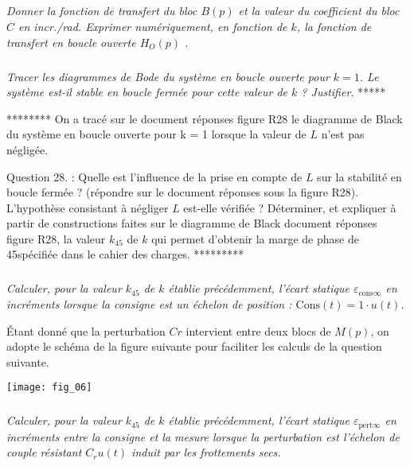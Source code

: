 \begin{multicols}{2}
\subparagraph{}\textit{Donner la fonction de transfert du bloc $B(p)$ et la valeur du coefficient du bloc $C$ en incr./rad.  
Exprimer numériquement, en fonction de $k$, la fonction de transfert en boucle ouverte $H_O(p)$ .}
\ifprof
\begin{corrige}
\end{corrige}
\else
\fi


\subparagraph{}\textit{Tracer les diagrammes de Bode du système en boucle ouverte pour $k = 1$.
Le système est-il stable en boucle fermée pour cette valeur de $k$ ? Justifier.
} *****
\ifprof
\begin{corrige}
\end{corrige}
\else
\fi

********
On a tracé sur le document réponses figure R28 le diagramme de Black du système en boucle ouverte pour k = 1 lorsque la valeur de $L$ n’est pas négligée.
 
Question 28. : 
Quelle est l’influence de la prise en compte de $L$ sur la stabilité en boucle fermée ? (répondre sur le document réponses sous la figure R28). L’hypothèse consistant à négliger $L$ est-elle vérifiée ?
Déterminer, et expliquer à partir de constructions faites sur le diagramme de Black document réponses figure R28, la valeur $k_{45}$ de $k$ qui permet d’obtenir la marge de phase de 45\degres  spécifiée dans le cahier des charges.
*********


\subparagraph{}\textit{Calculer, pour la valeur $k_{45}$ de $k$ établie précédemment, l’écart statique $\varepsilon_{\text{cons} \infty}$ en incréments lorsque la consigne est un échelon de position : $\text{Cons}(t) = 1\cdot u(t)$.}
\ifprof
\begin{corrige}
\end{corrige}
\else
\fi


Étant donné que la perturbation $Cr$ intervient entre deux blocs de $M(p)$, on adopte le schéma de la 
figure suivante pour faciliter les calculs de la question suivante. 

\begin{center}
\texttt{[image: fig\_06]}
\end{center}


\subparagraph{}\textit{Calculer, pour la valeur $k_{45}$ de $k$ établie précédemment, l’écart statique $\varepsilon_{\text{pert} \infty}$ en incréments entre la consigne et la mesure lorsque la perturbation est l’échelon de couple résistant $C_r u(t)$ induit par les frottements secs. }
\ifprof
\begin{corrige}
\end{corrige}
\else
\fi



\end{multicols}
